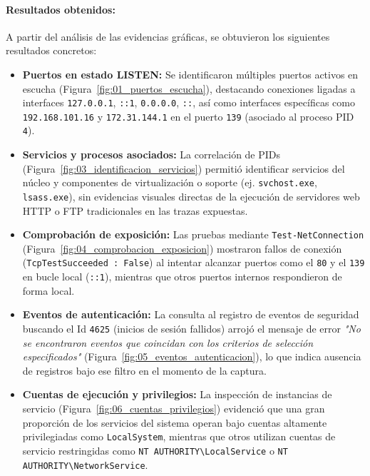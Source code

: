 \paragraph{Resultados obtenidos:}
A partir del análisis de las evidencias gráficas, se obtuvieron los siguientes resultados concretos:
\begin{itemize}
    \item \textbf{Puertos en estado LISTEN:} Se identificaron múltiples puertos activos en escucha (Figura~\ref{fig:01_puertos_escucha}), destacando conexiones ligadas a interfaces \texttt{127.0.0.1}, \texttt{::1}, \texttt{0.0.0.0}, \texttt{::}, así como interfaces específicas como \texttt{192.168.101.16} y \texttt{172.31.144.1} en el puerto \texttt{139} (asociado al proceso PID \texttt{4}).
    \item \textbf{Servicios y procesos asociados:} La correlación de PIDs (Figura~\ref{fig:03_identificacion_servicios}) permitió identificar servicios del núcleo y componentes de virtualización o soporte (ej. \texttt{svchost.exe}, \texttt{lsass.exe}), sin evidencias visuales directas de la ejecución de servidores web HTTP o FTP tradicionales en las trazas expuestas.
    \item \textbf{Comprobación de exposición:} Las pruebas mediante \texttt{Test-NetConnection} (Figura~\ref{fig:04_comprobacion_exposicion}) mostraron fallos de conexión (\texttt{TcpTestSucceeded : False}) al intentar alcanzar puertos como el \texttt{80} y el \texttt{139} en bucle local (\texttt{::1}), mientras que otros puertos internos respondieron de forma local.
    \item \textbf{Eventos de autenticación:} La consulta al registro de eventos de seguridad buscando el Id \texttt{4625} (inicios de sesión fallidos) arrojó el mensaje de error \textit{"No se encontraron eventos que coincidan con los criterios de selección especificados"} (Figura~\ref{fig:05_eventos_autenticacion}), lo que indica ausencia de registros bajo ese filtro en el momento de la captura.
    \item \textbf{Cuentas de ejecución y privilegios:} La inspección de instancias de servicio (Figura~\ref{fig:06_cuentas_privilegios}) evidenció que una gran proporción de los servicios del sistema operan bajo cuentas altamente privilegiadas como \texttt{LocalSystem}, mientras que otros utilizan cuentas de servicio restringidas como \texttt{NT AUTHORITY\textbackslash LocalService} o \texttt{NT AUTHORITY\textbackslash NetworkService}.
\end{itemize}

